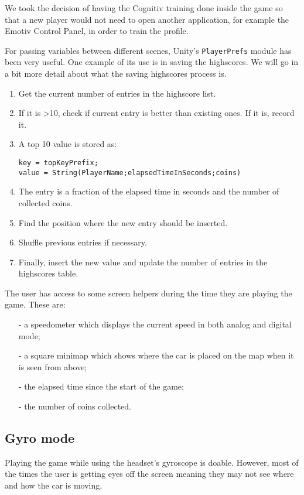 We took the decision of having the Cognitiv training done inside the game so that a new player would not need to open another application, for example the Emotiv Control Panel, in order to train the profile.

For passing variables between different scenes, Unity's \texttt{PlayerPrefs} module has been very useful. One example of its use is in saving the highscores. We will go in a bit more detail about what the saving highscores process is.
\begin{enumerate}
	\item Get the current number of entries in the highscore list.
	\item If it is \textgreater  10, check if current entry is better than existing ones. If it is, record it.
	\item A top 10 value is stored as: 
	
	\begin{Verbatim}[frame=single, framesep=3mm]
key = topKeyPrefix;
value = String(PlayerName;elapsedTimeInSeconds;coins)
	\end{Verbatim}
	\item The entry is a fraction of the elapsed time in seconds and the number of collected coins.
	\item Find the position where the new entry should be inserted.
	\item Shuffle previous entries if necessary.
	\item Finally, insert the new value and update the number of entries in the highscores table.
\end{enumerate}

The user has access to some screen helpers during the time they are playing the game. These are:
\begin{itemize}
	\item[-] a speedometer which displays the current speed in both analog and digital mode;
	\item[-] a square minimap which shows where the car is placed on the map when it is seen from above;
	\item[-] the elapsed time since the start of the game;
	\item[-] the number of coins collected.
\end{itemize}

\subsection{Gyro mode}
Playing the game while using the headset's gyroscope is doable. However, most of the times the user is getting eyes off the screen meaning they may not see where and how the car is moving. 
